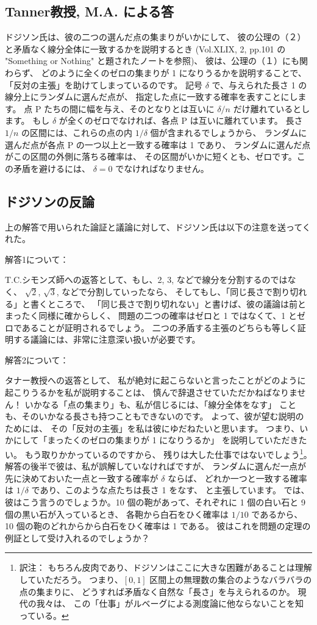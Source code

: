 \documentclass{article}
\begin{document}
\subsection{Tanner教授, M.A. による答}

 ドジソン氏は、彼の二つの選んだ点の集まりがいかにして、
彼の公理の（２）と矛盾なく線分全体に一致するかを説明するとき
(Vol.XLIX, 2, pp.101 の "Something or Nothing" と題されたノートを参照)、
彼は、公理の（１）にも関わらず、
どのように全くのゼロの集まりが 1 になりうるかを説明することで、
「反対の主張」を助けてしまっているのです。
 記号 $\delta$ で、与えられた長さ 1 の線分上にランダムに選んだ点が、
指定した点に一致する確率を表すことにします。
点 P たちの間に幅を与え、そのとなりとは互いに $\delta / n$
だけ離れているとします。
もし $\delta$ が全くのゼロでなければ、各点 P は互いに離れています。
長さ $1/n$ の区間には、これらの点の内 $1/\delta$ 個が含まれるでしょうから、
ランダムに選んだ点が各点 P の一つ以上と一致する確率は 1 であり、
ランダムに選んだ点がこの区間の外側に落ちる確率は、
その区間がいかに短くとも、ゼロです。この矛盾を避けるには、
$\delta = 0$ でなければなりません。

\subsection{ドジソンの反論}

上の解答で用いられた論証と議論に対して、ドジソン氏は以下の注意を送ってくれた。

解答1について：

T.C.シモンズ師への返答として、もし、2, 3, などで線分を分割するのではなく、
$\sqrt{2}$, $\sqrt{3}$, などで分割していったなら、
そしてもし、「同じ長さで割り切れる」と書くところで、
「同じ長さで割り切れない」と書けば、彼の議論は前とまったく同様に確からしく、
問題の二つの確率はゼロと 1 ではなくて、1 とゼロであることが証明されるでしょう。
二つの矛盾する主張のどちらも等しく証明する議論には、非常に注意深い扱いが必要です。

解答2について：

タナー教授への返答として、
私が絶対に起こらないと言ったことがどのように起こりうるかを私が説明することは、
慎んで辞退させていただかねばなりません！
いかなる「点の集まり」も、私が信じるには、「線分全体をなす」
ことも、そのいかなる長さも持つこともできないのです。
よって、彼が望む説明のためには、
その「反対の主張」を私は彼にゆだねたいと思います。
つまり、いかにして「まったくのゼロの集まりが 1 になりうるか」
を説明していただきたい。
もう取りかかっているのですから、
残りは大した仕事ではないでしょう\footnote{訳注：
もちろん皮肉であり、ドジソンはここに大きな困難があることは理解していただろう。
つまり、$[0, 1]$ 区間上の無理数の集合のようなバラバラの点の集まりに、
どうすれば矛盾なく自然な「長さ」を与えられるのか。
現代の我々は、
この「仕事」がルベーグによる測度論に他ならないことを知っている。}。
解答の後半で彼は、私が誤解していなければですが、
ランダムに選んだ一点が先に決めておいた一点と一致する確率が $\delta$ ならば、
どれか一つと一致する確率は $1/\delta$ であり、このような点たちは長さ 1 をなす、
と主張しています。
では、彼はこう言うのでしょうか。10 個の鞄があって、それぞれに
1 個の白い石と 9 個の黒い石が入っているとき、
各鞄から白石をひく確率は $1/10$ であるから、
10 個の鞄のどれからから白石をひく確率は 1 である。
彼はこれを問題の定理の例証として受け入れるのでしょうか？
\end{document}
